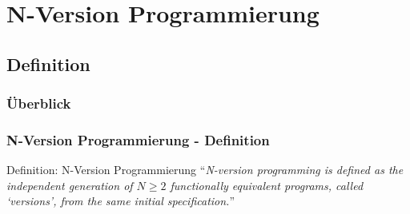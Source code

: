 \section{N-Version Programmierung}
\subsection{Definition}
%
%
\begin{frame}
	\frametitle{Überblick}
	\tableofcontents[currentsubsection]
\end{frame}
%
%
\begin{frame}
	\frametitle{N-Version Programmierung - Definition}
	\begin{block}{Definition: N-Version Programmierung \cite{Chen1978}}
		\enquote{\emph{N-version programming is defined as the independent generation of $ N \geq 2 $ functionally equivalent programs, called \enquote{versions}, from the same initial specification.}}
	\end{block}
\end{frame}
%
